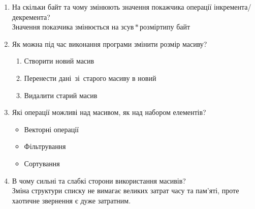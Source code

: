 \begin{enumerate}
\begin{verbatim}
                    for(auto j = 0; j < m; ++i) {
                        std::cout << array[k][j] << "\n";
                    }
            \end{verbatim}
    \item На скільки байт та чому змінюють значення покажчика операції інкремента/декремента? \\
          Значення показчика змінюється на $зсув * розмір типу$ байт
    \item Як можна під час виконання програми змінити розмір масиву? \\
          \begin{enumerate}
              \item Створити новий масив
              \item Перенести дані зі старого масиву в новий
              \item Видалити старий масив
          \end{enumerate}
    \item Які операції можливі над масивом, як над набором елементів? \\
          \begin{itemize}
              \item Векторні операції
              \item Фільтрування
              \item Сортування
          \end{itemize}
    \item В чому сильні та слабкі сторони використання масивів? \\
          Зміна структури списку не вимагає великих затрат часу та пам'яті,
          проте хаотичне звернення є дуже затратним.
\end{enumerate}
